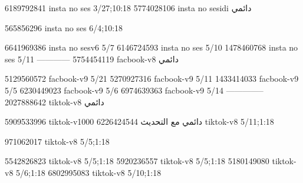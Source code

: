 
6189792841 insta no ses
3/27;10:18
5774028106 insta no sesidi
دائمي


565856296 insta no ses
6/4;10:18

6641969386 insta no sesv6
5/7
6146724593 insta no ses
5/10
1478460768 insta no ses
5/11
------------
5754454119 facbook-v8
دائمي

5129560572 facbook-v9
5/21
5270927316 facbook-v9
5/11
1433414033 facbook-v9
5/5
6230449023 facbook-v9
5/6
6974639363 facbook-v9
5/14
--------------
2027888642 tiktok-v8
دائمي

5909533996 tiktok-v1000
دائمي مع التحديث
6226424544 tiktok-v8
5/11;1:18



971062017 tiktok-v8
5/5;1:18

5542826823 tiktok-v8
5/5;1:18
5920236557 tiktok-v8
5/5;1:18
5180149080 tiktok-v8
5/6;1:18
6802995083 tiktok-v8
5/10;1:18

